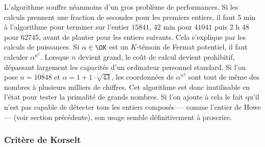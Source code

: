 L'algorithme souffre néanmoins d'un gros problème de performances. Si les calculs prennent une fraction de secondes pour les premiers entiers, il faut 5 min à l'algorithme pour terminer sur l'entier $15841$, 42 min pour $41041$ puis 2 h 48 pour 62745, avant de planter pour les entiers suivants. Cela s'explique par les calculs de puissances. Si $\alpha\in \OK$ est un $K$-témoin de Fermat potentiel, il faut calculer $\alpha^{n^2}$. Lorsque $n$ devient grand, le coût de calcul devient prohibitif, dépassant largement les capacités d'un ordinateur personnel standard. Si l'on pose $n = 10848$ et $\alpha = 1 + 1\cdot \sqrt{43}$, les coordonnées de $\alpha^{n^2}$ sont tout de même des nombres à plusieurs milliers de chiffres. Cet algorithme est donc inutilisable en l'état pour tester la primalité de grands nombres. Si l'on ajoute à cela le fait qu'il n'est pas capable de détecter tous les entiers composés — comme l'entier de Howe — (voir section précédente), son usage semble définitivement à proscrire.
	

\subsubsection{Critère de Korselt}
